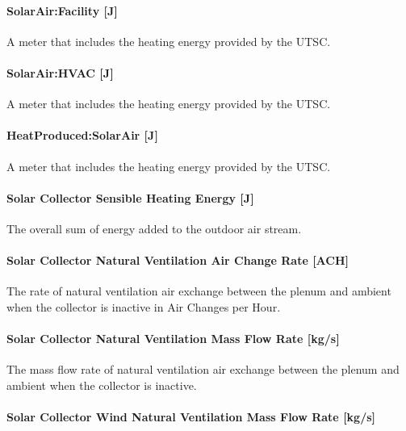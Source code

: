 \paragraph{SolarAir:Facility {[}J{]}}\label{solarairfacility-j}

A meter that includes the heating energy provided by the UTSC.

\paragraph{SolarAir:HVAC {[}J{]}}\label{solarairhvac-j}

A meter that includes the heating energy provided by the UTSC.

\paragraph{HeatProduced:SolarAir {[}J{]}}\label{heatproducedsolarair-j}

A meter that includes the heating energy provided by the UTSC.

\paragraph{Solar Collector Sensible Heating Energy {[}J{]}}\label{solar-collector-sensible-heating-energy-j}

The overall sum of energy added to the outdoor air stream.

\paragraph{Solar Collector Natural Ventilation Air Change Rate {[}ACH{]}}\label{solar-collector-natural-ventilation-air-change-rate-ach}

The rate of natural ventilation air exchange between the plenum and ambient when the collector is inactive in Air Changes per Hour.

\paragraph{Solar Collector Natural Ventilation Mass Flow Rate {[}kg/s{]}}\label{solar-collector-natural-ventilation-mass-flow-rate-kgs}

The mass flow rate of natural ventilation air exchange between the plenum and ambient when the collector is inactive.

\paragraph{Solar Collector Wind Natural Ventilation Mass Flow Rate {[}kg/s{]}}\label{solar-collector-wind-natural-ventilation-mass-flow-rate-kgs}

